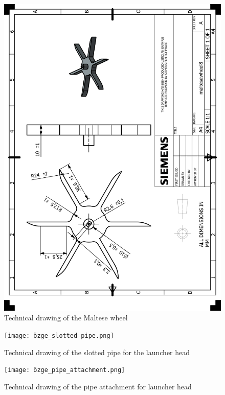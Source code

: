 \documentclass[12pt]{article}
\begin{document}
\begin{appendices}
\begin{figure}[H]
    \centering
    \includegraphics[width=\textwidth]{HP_maltesewheel8.png} 
    \caption{Technical drawing of the Maltese wheel}
    \label{fig:technical-drawing}
\end{figure}

\begin{figure}[H]
    \centering
    \texttt{[image: özge\_slotted pipe.png]} 
    \caption{Technical drawing of the slotted pipe for the launcher head}
    \label{fig:technical-drawing}
\end{figure}

\begin{figure}[H]
    \centering
    \texttt{[image: özge\_pipe\_attachment.png]} 
    \caption{Technical drawing of the pipe attachment for launcher head}
    \label{fig:technical-drawing}
\end{figure}


\end{appendices}
\end{document}
